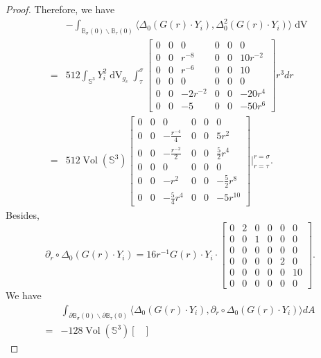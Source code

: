 \documentclass[11pt,letterpaper]{amsart}
\DeclareMathOperator{\Vol}{Vol}
\DeclareMathOperator{\dvol}{dV}
\newcommand{\bB}{\mathbb{B}}
\newcommand{\bS}{\mathbb{S}}
\theoremstyle{definition}
\theoremstyle{remark}
\numberwithin{equation}{section}
\begin{document}
\begin{proof}
Therefore, we have
\begin{equation}
\begin{split}
    &-\int_{\bB_{\sigma}(0)\backslash \bB_{\tau}(0)}\langle \Delta_0 (G(r)\cdot Y_i), \Delta^2_0(G(r)\cdot Y_i)\rangle \dvol\\
=&512\int_{\bS^3} Y^2_i\dvol_{g_c}\int_{\tau}^{\sigma}\begin{bmatrix}
0 & 0 & 0 & 0 & 0& 0\\
0 & 0 & r^{-8} & 0 & 0& 10r^{-2}\\
0 & 0 & r^{-6} & 0 & 0& 10\\
0 & 0 & 0 & 0 & 0& 0\\
0 & 0 & -2r^{-2} & 0 & 0& -20r^4\\
0 & 0 & -5 & 0 & 0 & -50r^6
\end{bmatrix}r^3dr\\
=&512\Vol(\bS^3) \begin{bmatrix}
0 & 0 & 0 & 0 & 0& 0\\
0 & 0 & -\frac{r^{-4}}{4} & 0 & 0& 5r^{2}\\
0 & 0 & -\frac{r^{-2}}{2} & 0 & 0& \frac{5}{2}r^4\\
0 & 0 & 0 & 0 & 0& 0\\
0 & 0 & -r^2 & 0 & 0& -\frac{5}{2}r^8\\
0 & 0 & -\frac{5}{4}r^4 & 0 & 0 & -5r^{10}
\end{bmatrix}\Bigg|_{r=\tau}^{r=\sigma}.
    \end{split}
\end{equation}
Besides,
\begin{equation}
    \partial_r \circ \Delta_0(G(r)\cdot Y_i)=16 r^{-1} G(r)\cdot Y_i\cdot 
    \begin{bmatrix}
0 & 2 & 0 & 0 & 0& 0\\
0 & 0 & 1 & 0 & 0& 0\\
0 & 0 & 0 & 0 & 0& 0\\
0 & 0 & 0 & 0 & 2& 0\\
0 & 0 & 0 & 0 & 0& 10\\
0 & 0 & 0 & 0 & 0& 0
\end{bmatrix}.
\end{equation}
We have
\begin{equation}
\begin{split}
    &\int_{\partial \bB_{\sigma}(0)\backslash \partial \bB_{\tau}(0)} \langle \Delta_0(G(r)\cdot Y_i), \partial_r \circ \Delta_0(G(r)\cdot Y_i) \rangle dA\\
    =&-128 \Vol(\bS^3) \begin{bmatrix}

\end{bmatrix}
\end{split}
\end{equation}
\end{proof}
\end{document}
